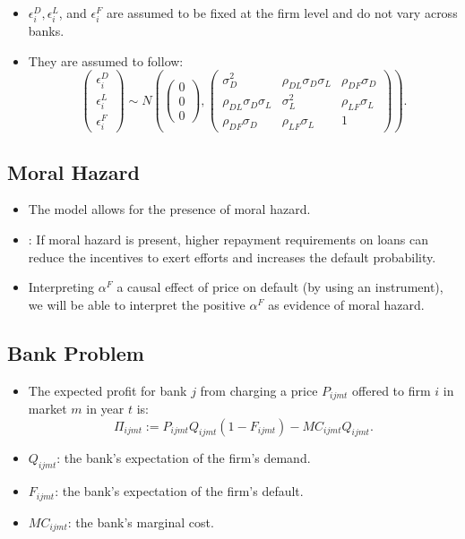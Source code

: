 \documentclass[]{book}
\providecommand{\tightlist}{%
  \setlength{\itemsep}{0pt}\setlength{\parskip}{0pt}}
\begin{document}
\begin{itemize}
\tightlist
\item
  \(\epsilon_i^D, \epsilon_i^L\), and \(\epsilon_i^F\) are assumed to be
  fixed at the firm level and do not vary across banks.
\item
  They are assumed to follow: \[
  \begin{pmatrix}
  \epsilon_i^D\\
  \epsilon_i^L\\
  \epsilon_i^F
  \end{pmatrix}
  \sim
  N
  \left( 
  \begin{pmatrix}
  0 \\
  0 \\
  0
  \end{pmatrix},
  \begin{pmatrix}
  \sigma_D^2 & \rho_{DL} \sigma_D \sigma_L & \rho_{DF} \sigma_D\\
  \rho_{DL} \sigma_D \sigma_L & \sigma_L^2 & \rho_{LF} \sigma_L\\
  \rho_{DF} \sigma_D & \rho_{LF} \sigma_L & 1
  \end{pmatrix}
  \right).
  \]
\end{itemize}

\subsection{Moral Hazard}\label{moral-hazard}

\begin{itemize}
\tightlist
\item
  The model allows for the presence of moral hazard.
\item
  \citet{holmstromFinancialIntermediationLoanable1997}: If moral hazard
  is present, higher repayment requirements on loans can reduce the
  incentives to exert efforts and increases the default probability.
\item
  Interpreting \(\alpha^F\) a causal effect of price on default (by
  using an instrument), we will be able to interpret the positive
  \(\alpha^F\) as evidence of moral hazard.
\end{itemize}

\subsection{Bank Problem}\label{bank-problem}

\begin{itemize}
\tightlist
\item
  The expected profit for bank \(j\) from charging a price \(P_{ijmt}\)
  offered to firm \(i\) in market \(m\) in year \(t\) is: \[
  \Pi_{ijmt} := P_{ijmt} Q_{ijmt} (1 - F_{ijmt}) - MC_{ijmt} Q_{ijmt}.
  \]
\item
  \(Q_{ijmt}\): the bank's expectation of the firm's demand.
\item
  \(F_{ijmt}\): the bank's expectation of the firm's default.
\item
  \(MC_{ijmt}\): the bank's marginal cost.
\end{itemize}
\end{document}
